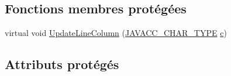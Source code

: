\subsection*{Fonctions membres protégées}
\begin{DoxyCompactItemize}
\item 
virtual void \hyperlink{classvhdl_1_1parser_1_1_char_stream_a854b05bdd3eb436307efd3e5bd14fd7d}{Update\+Line\+Column} (\hyperlink{_java_c_c_8h_a401fffd20e03e2993f9588187b65afc3}{J\+A\+V\+A\+C\+C\+\_\+\+C\+H\+A\+R\+\_\+\+T\+Y\+P\+E} \hyperlink{060__command__switch_8tcl_ab14f56bc3bd7680490ece4ad7815465f}{c})
\end{DoxyCompactItemize}
\subsection*{Attributs protégés}
